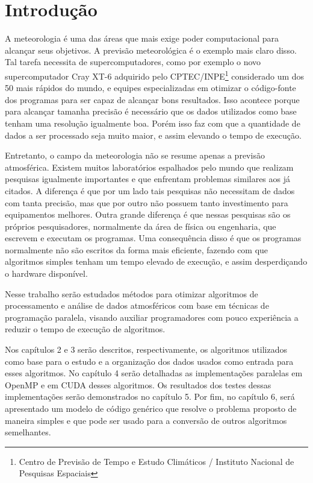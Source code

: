 \chapter{Introdução}

A meteorologia é uma das áreas que mais exige poder computacional para alcançar seus objetivos. A previsão meteorológica é o exemplo mais claro disso. Tal tarefa necessita de supercomputadores, como por exemplo o novo supercomputador Cray XT-6 adquirido pelo CPTEC/INPE\footnote{Centro de Previsão de Tempo e Estudo Climáticos / Instituto Nacional de Pesquisas Espaciais} considerado um dos 50 mais rápidos do mundo, e equipes especializadas em otimizar o código-fonte dos programas para ser capaz de alcançar bons resultados. Isso acontece porque para alcançar tamanha precisão é necessário que os dados utilizados como base tenham uma resolução igualmente boa. Porém isso faz com que a quantidade de dados a ser processado seja muito maior, e assim elevando o tempo de execução.

Entretanto, o campo da meteorologia não se resume apenas a previsão atmosférica. Existem muitos laboratórios espalhados pelo mundo que realizam pesquisas igualmente importantes e que enfrentam problemas similares aos já citados. A diferença é que por um lado tais pesquisas não necessitam de dados com tanta precisão, mas que por outro não possuem tanto investimento para equipamentos melhores. Outra grande diferença é que nessas pesquisas são os próprios pesquisadores, normalmente da área de física ou engenharia, que escrevem e executam os programas. Uma consequência disso é que os programas normalmente não são escritos da forma mais eficiente, fazendo com que algoritmos simples tenham um tempo elevado de execução, e assim desperdiçando o hardware disponível.

Nesse trabalho serão estudados métodos para otimizar algoritmos de processamento e análise de dados atmosféricos com base em técnicas de programação paralela, visando auxiliar programadores com pouco experiência a reduzir o tempo de execução de algoritmos. 

Nos capítulos 2 e 3 serão descritos, respectivamente, os algoritmos utilizados como base para o estudo e a organização dos dados usados como entrada para esses algoritmos. No capítulo 4 serão detalhadas as implementações paralelas em OpenMP e em CUDA desses algoritmos. Os resultados dos testes dessas implementações serão demonstrados no capítulo 5. Por fim, no capítulo 6, será apresentado um modelo de código genérico que resolve o problema proposto de maneira simples e que pode ser usado para a conversão de outros algoritmos semelhantes.